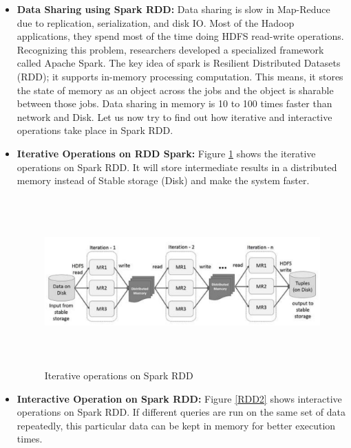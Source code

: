 \begin{itemize}
\item \textbf{Data Sharing using Spark RDD:} Data sharing is slow in Map-Reduce due to replication, serialization, and disk IO. Most of the Hadoop applications, they spend most of the time doing HDFS read-write operations. Recognizing this problem, researchers developed a specialized framework called Apache Spark. The key idea of spark is Resilient Distributed Datasets (RDD); it supports in-memory processing computation. This means, it stores the state of memory as an object across the jobs and the object is sharable between those jobs. Data sharing in memory is 10 to 100 times faster than network and Disk.
Let us now try to find out how iterative and interactive operations take place in Spark RDD.

\item \textbf{Iterative Operations on RDD Spark:} Figure \ref{RDD1} shows the iterative operations on Spark RDD. It will store intermediate results in a distributed memory instead of Stable storage (Disk) and make the system faster.



\begin{figure}[H]
\begin{center}
\includegraphics[width=16cm,height=6.5cm]{chapter2/fig6.png}
\end{center}
\caption{Iterative operations on Spark RDD}
\label{RDD1}
\end{figure}



\item \textbf{Interactive Operation on Spark RDD:} Figure \ref{RDD2} shows interactive operations on Spark RDD. If different queries are run on the same set of data repeatedly, this particular data can be kept in memory for better execution times.\\


\end{itemize}
